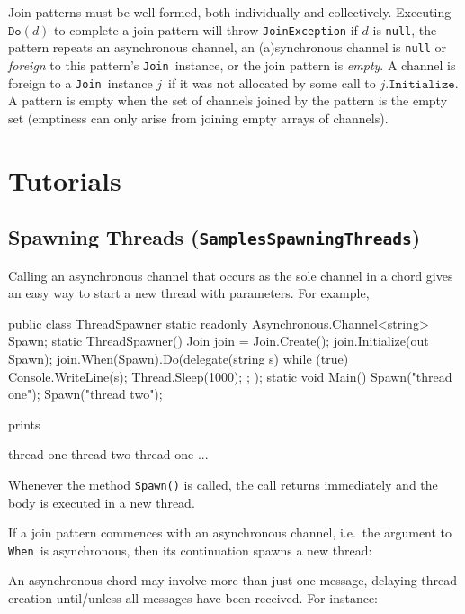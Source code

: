 \documentclass{article}
\newcommand{\sample}[1]{\texorpdfstring{{(\texttt{Samples{\symbol{92}}#1})}}{}}
\newcommand{\cjoin}{{\texttt{Join}}}
\newcommand{\mwhen}{{\texttt{When}}}
\newcommand{\typeref}[1]{{\texttt{#1}}}
\newcommand{\dotinitialize}{\texttt{.Initialize}}
\newcommand{\Do}{\texttt{Do}}
\newcommand{\joinobj}{\ensuremath{j}}
\newcommand{\delegate}{\ensuremath{d}}
\begin{document}
Join patterns must be well-formed, both individually and collectively. Executing $\Do(\delegate)$ to
complete a join pattern will throw \typeref{JoinException} if $\delegate$ is
\texttt{null}, the pattern repeats an asynchronous channel, an (a)synchronous
channel is \texttt{null} or \emph{foreign} to this pattern's \cjoin\ instance, 
or the join pattern is \emph{empty}.
A channel is foreign to a \cjoin\ instance \joinobj\ if it was not allocated by some call to
$\joinobj\dotinitialize$.
A pattern is empty when the set of channels joined by the pattern is the empty set 
(emptiness can only arise from joining empty arrays of channels).


\section{Tutorials}\label{tutorials}

\subsection{Spawning Threads \sample{SpawningThreads}}

Calling an asynchronous channel that
occurs as the sole channel in a chord gives an easy way to start a new thread
with parameters. For example,
\begin{lstcsharp}
public class ThreadSpawner {
  static readonly Asynchronous.Channel<string> Spawn;
  static ThreadSpawner() {
    Join join = Join.Create();
    join.Initialize(out Spawn);
    join.When(Spawn).Do(delegate(string s) {
      while (true) {
        Console.WriteLine(s);
        Thread.Sleep(1000);
      };
    });
  }
  static void Main() {
    Spawn("thread one");
    Spawn("thread two");
  }
}
\end{lstcsharp}
prints
\begin{lstcsharp}
thread one
thread two
thread one
...
\end{lstcsharp}

Whenever the method \verb|Spawn()| is called, the call returns immediately
and the body is executed in a new thread.

If a join pattern commences with an asynchronous channel, i.e.\
the argument to \mwhen\ is asynchronous,
then its continuation spawns a new thread:

An asynchronous chord may involve more than just one message, delaying thread creation until/unless all
messages have been received. For instance:
\end{document}
